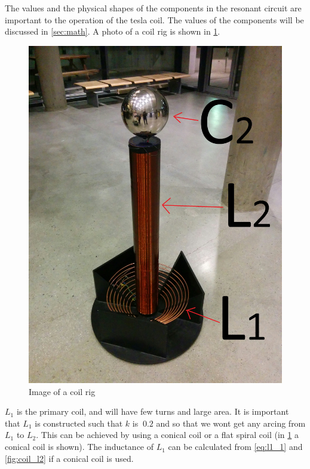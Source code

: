 The values and the physical shapes of the components in the resonant circuit are important to the operation of the tesla coil. The values of the components will be discussed in \cref{sec:math}. A photo of a coil rig is shown in \cref{fig:foto:coilrig}.

\begin{figure}
    \centering
    \includegraphics[width=\textwidth]{img/foto/IMG_20170201_172204.jpg}
    \caption{Image of a coil rig}
    \label{fig:foto:coilrig}
\end{figure}

$L_1$ is the primary coil, and will have few turns and large area. It is important that $L_1$ is constructed such that $k$ is $~0.2$ and so that we wont get any arcing from $L_1$ to $L_2$. This can be achieved by using a conical coil or a flat spiral coil (in \cref{fig:foto:coilrig} a conical coil is shown). The inductance of $L_1$ can be calculated from \cref{eq:l1_1} and \cref{fig:coil_l2} if a conical coil is used.

